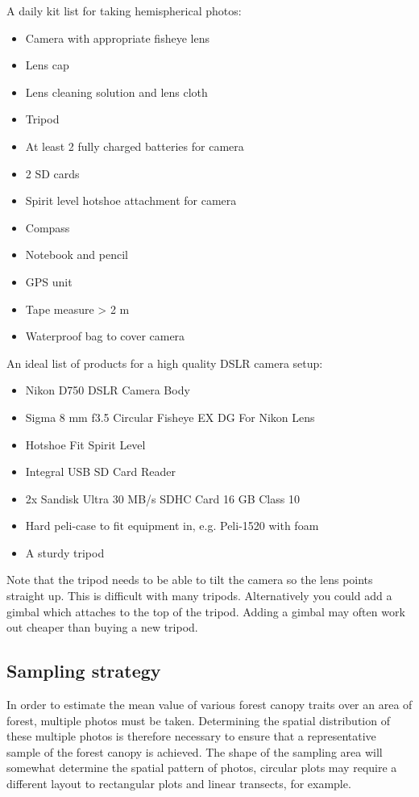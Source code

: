 \documentclass[11pt,a4paper]{article}
\begin{document}
A daily kit list for taking hemispherical photos:

\begin{itemize}
	\item{Camera with appropriate fisheye lens}
	\item{Lens cap}
	\item{Lens cleaning solution and lens cloth}
	\item{Tripod}
	\item{At least 2 fully charged batteries for camera}
	\item{2 SD cards}
	\item{Spirit level hotshoe attachment for camera}
	\item{Compass}
	\item{Notebook and pencil}
	\item{GPS unit}
	\item{Tape measure > 2 m}
	\item{Waterproof bag to cover camera}
\end{itemize}

An ideal list of products for a high quality DSLR camera setup:

\begin{itemize}
	\item{Nikon D750 DSLR Camera Body}
	\item{Sigma 8 mm f3.5 Circular Fisheye EX DG For Nikon Lens}
	\item{Hotshoe Fit Spirit Level}
	\item{Integral USB SD Card Reader}
	\item{2x Sandisk Ultra 30 MB/s SDHC Card 16 GB Class 10}
	\item{Hard peli-case to fit equipment in, e.g. Peli-1520 with foam}
	\item{A sturdy tripod}
\end{itemize}

Note that the tripod needs to be able to tilt the camera so the lens points straight up. This is difficult with many tripods. Alternatively you could add a gimbal which attaches to the top of the tripod. Adding a gimbal may often work out cheaper than buying a new tripod.

\subsection{Sampling strategy}

In order to estimate the mean value of various forest canopy traits over an area of forest, multiple photos must be taken. Determining the spatial distribution of these multiple photos is therefore necessary to ensure that a representative sample of the forest canopy is achieved. The shape of the sampling area will somewhat determine the spatial pattern of photos, circular plots may require a different layout to rectangular plots and linear transects, for example.
\end{document}
